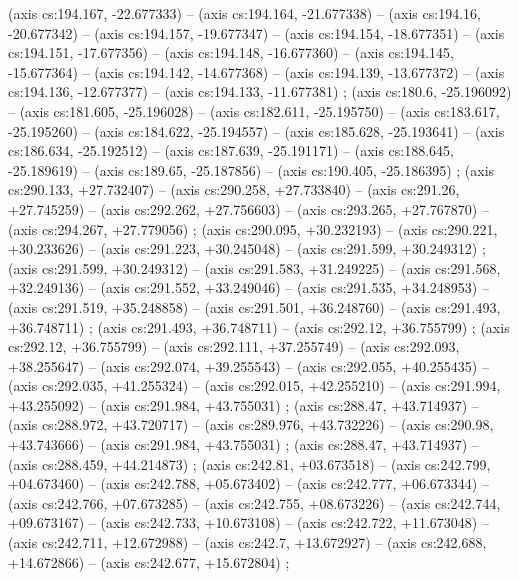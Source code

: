     (axis cs:194.167,    -22.677333) --  (axis cs:194.164,    -21.677338) --  (axis cs:194.16,    -20.677342) --  (axis cs:194.157,    -19.677347) --  (axis cs:194.154,    -18.677351) --  (axis cs:194.151,    -17.677356) --  (axis cs:194.148,    -16.677360) --  (axis cs:194.145,    -15.677364) --  (axis cs:194.142,    -14.677368) --  (axis cs:194.139,    -13.677372) --  (axis cs:194.136,    -12.677377) --  (axis cs:194.133,    -11.677381) ;
    (axis cs:180.6,    -25.196092) --  (axis cs:181.605,    -25.196028) --  (axis cs:182.611,    -25.195750) --  (axis cs:183.617,    -25.195260) --  (axis cs:184.622,    -25.194557) --  (axis cs:185.628,    -25.193641) --  (axis cs:186.634,    -25.192512) --  (axis cs:187.639,    -25.191171) --  (axis cs:188.645,    -25.189619) --  (axis cs:189.65,    -25.187856) --  (axis cs:190.405,    -25.186395) ;
    (axis cs:290.133,    +27.732407) --  (axis cs:290.258,    +27.733840) --  (axis cs:291.26,    +27.745259) --  (axis cs:292.262,    +27.756603) --  (axis cs:293.265,    +27.767870) --  (axis cs:294.267,    +27.779056) ;
    (axis cs:290.095,    +30.232193) --  (axis cs:290.221,    +30.233626) --  (axis cs:291.223,    +30.245048) --  (axis cs:291.599,    +30.249312) ;
    (axis cs:291.599,    +30.249312) --  (axis cs:291.583,    +31.249225) --  (axis cs:291.568,    +32.249136) --  (axis cs:291.552,    +33.249046) --  (axis cs:291.535,    +34.248953) --  (axis cs:291.519,    +35.248858) --  (axis cs:291.501,    +36.248760) --  (axis cs:291.493,    +36.748711) ;
    (axis cs:291.493,    +36.748711) --  (axis cs:292.12,    +36.755799) ;
    (axis cs:292.12,    +36.755799) --  (axis cs:292.111,    +37.255749) --  (axis cs:292.093,    +38.255647) --  (axis cs:292.074,    +39.255543) --  (axis cs:292.055,    +40.255435) --  (axis cs:292.035,    +41.255324) --  (axis cs:292.015,    +42.255210) --  (axis cs:291.994,    +43.255092) --  (axis cs:291.984,    +43.755031) ;
    (axis cs:288.47,    +43.714937) --  (axis cs:288.972,    +43.720717) --  (axis cs:289.976,    +43.732226) --  (axis cs:290.98,    +43.743666) --  (axis cs:291.984,    +43.755031) ;
    (axis cs:288.47,    +43.714937) --  (axis cs:288.459,    +44.214873) ;
    (axis cs:242.81,    +03.673518) --  (axis cs:242.799,    +04.673460) --  (axis cs:242.788,    +05.673402) --  (axis cs:242.777,    +06.673344) --  (axis cs:242.766,    +07.673285) --  (axis cs:242.755,    +08.673226) --  (axis cs:242.744,    +09.673167) --  (axis cs:242.733,    +10.673108) --  (axis cs:242.722,    +11.673048) --  (axis cs:242.711,    +12.672988) --  (axis cs:242.7,    +13.672927) --  (axis cs:242.688,    +14.672866) --  (axis cs:242.677,    +15.672804) ;
